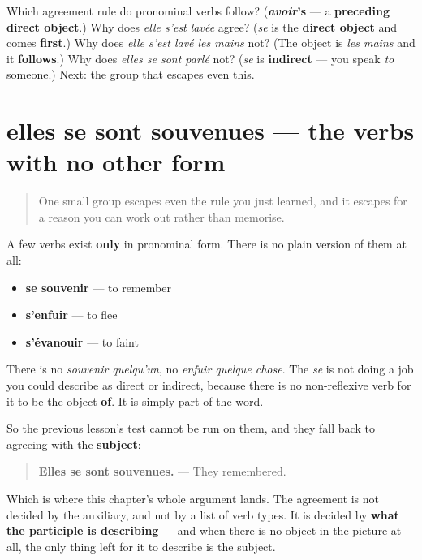 \begin{tcolorbox}[breakable,colback=teal!4,colframe=teal!35!black,title={Before you move on}]
Which agreement rule do pronominal verbs follow? (\textbf{\emph{avoir}'s} — a \textbf{preceding direct object}.) Why does \emph{elle s'est lavée} agree? (\emph{se} is the \textbf{direct object} and comes \textbf{first}.) Why does \emph{elle s'est lavé les mains} not? (The object is \emph{les mains} and it \textbf{follows}.) Why does \emph{elles se sont parlé} not? (\emph{se} is \textbf{indirect} — you speak \emph{to} someone.) Next: the group that escapes even this.
\end{tcolorbox}
\section[elles se sont souvenues]{elles se sont souvenues — the verbs with no other form}

\label{lesson:FR-C16-pronominal-seul}



\begin{quote}
One small group escapes even the rule you just learned, and it escapes for a reason you can work out rather than memorise.
\end{quote}

\begin{grammarlens}[title={Grammar Lens: no object to be an object of}]
A few verbs exist \textbf{only} in pronominal form. There is no plain version of them at all:

\begin{itemize}
\raggedright
  \item \textbf{se souvenir} — to remember
  \item \textbf{s'enfuir} — to flee
  \item \textbf{s'évanouir} — to faint
\end{itemize}

There is no \emph{souvenir quelqu'un}, no \emph{enfuir quelque chose}. The \emph{se} is not doing a job you could describe as direct or indirect, because there is no non-reflexive verb for it to be the object \textbf{of}. It is simply part of the word.

So the previous lesson's test cannot be run on them, and they fall back to agreeing with the \textbf{subject}:

\begin{quote}
\textbf{Elles se sont souvenues.} — They remembered.
\end{quote}

Which is where this chapter's whole argument lands. The agreement is not decided by the auxiliary, and not by a list of verb types. It is decided by \textbf{what the participle is describing} — and when there is no object in the picture at all, the only thing left for it to describe is the subject.
\end{grammarlens}

